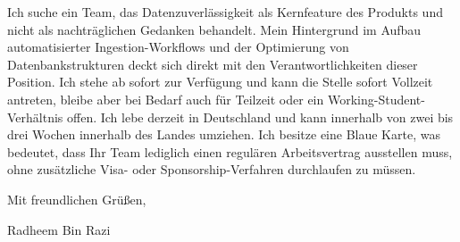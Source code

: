 \documentclass[11pt,a4paper]{coverletter}
\begin{document}
Ich suche ein Team, das Datenzuverlässigkeit als Kernfeature des Produkts und nicht als nachträglichen Gedanken behandelt. Mein Hintergrund im Aufbau automatisierter Ingestion-Workflows und der Optimierung von Datenbankstrukturen deckt sich direkt mit den Verantwortlichkeiten dieser Position. Ich stehe ab sofort zur Verfügung und kann die Stelle sofort Vollzeit antreten, bleibe aber bei Bedarf auch für Teilzeit oder ein Working-Student-Verhältnis offen. Ich lebe derzeit in Deutschland und kann innerhalb von zwei bis drei Wochen innerhalb des Landes umziehen. Ich besitze eine Blaue Karte, was bedeutet, dass Ihr Team lediglich einen regulären Arbeitsvertrag ausstellen muss, ohne zusätzliche Visa- oder Sponsorship-Verfahren durchlaufen zu müssen.

\closing{Mit freundlichen Grüßen,}{Radheem Bin Razi}
\end{document}
